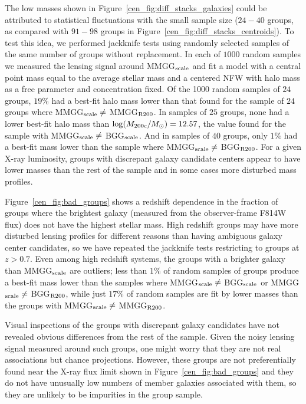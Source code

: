The low masses shown in
Figure~\ref{cen_fig:diff_stacks_galaxies} could be attributed to
statistical fluctuations with the small sample size ($24-40$ groups,
as compared with $91-98$ groups in
Figure~\ref{cen_fig:diff_stacks_centroids}). To test this idea, we performed
jackknife tests using randomly selected samples of the same number of groups without
replacement. In each of $1000$ random samples we measured the lensing
signal around MMGG$_{\rm scale}$ and fit a model with a central point
mass equal to the average stellar mass and a centered NFW with halo
mass as a free parameter and concentration fixed. Of the 1000 random samples of
$24$ groups, $19\%$ had a best-fit halo mass lower than that found for
the sample of $24$ groups where MMGG$_{\rm scale} \ne$ MMGG$_{\rm
  R200}$. In samples of $25$ groups, none had a lower best-fit halo
mass than $\log(M_{\rm 200c}/M_{\odot})=12.57$, the value found for
the sample with MMGG$_{\rm scale} \ne$ BGG$_{\rm scale}$. And in
samples of $40$ groups, only $1\%$ had a best-fit mass lower than the
sample where MMGG$_{\rm scale} \ne$ BGG$_{\rm R200}$. For a given
X-ray luminosity, groups with discrepant galaxy candidate centers
appear to have lower masses than the rest of the sample and
in some cases more
disturbed mass profiles. 

Figure~\ref{cen_fig:bad_groups} shows a redshift dependence in the
fraction of groups where the brightest galaxy (measured from the
observer-frame F814W flux) does not have the highest stellar
mass. High redshift groups may have more disturbed lensing profiles
for different reasons than having ambiguous galaxy center candidates,
so we have repeated the jackknife tests restricting to groups at
$z>0.7$. Even among high redshift systems, the groups with a brighter
galaxy than MMGG$_{\rm scale}$ are outliers; less than $1\%$ of random
samples of groups produce a best-fit mass lower than the samples where
MMGG$_{\rm scale} \ne$ BGG$_{\rm scale}$ or MMGG$_{\rm scale} \ne$
BGG$_{\rm R200}$, while just $17\%$ of random samples are fit by lower
masses than the groups with MMGG$_{\rm scale} \ne$ MMGG$_{\rm R200}$.

Visual inspections of the groups with discrepant galaxy candidates
have not revealed obvious differences from the rest of the
sample. Given the noisy lensing signal measured around such groups, one might
worry that they are not real associations but chance
projections. However, these groups are not preferentially found near
the X-ray flux limit shown in Figure~\ref{cen_fig:bad_groups} and they do
not have unusually low numbers of member galaxies associated with
them, so they are unlikely to be impurities in the group sample.

